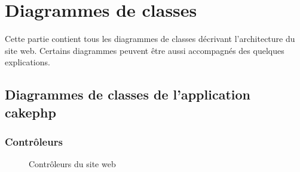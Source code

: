 \chapter{Diagrammes de classes}

Cette partie contient tous les diagrammes de classes décrivant l'architecture du site web. Certains diagrammes peuvent être aussi accompagnés des quelques explications.
 
\newpage

\section{Diagrammes de classes de l'application cakephp}

\subsection{Contrôleurs}

\begin{figure}[H]
	\begin{center}\end{center}
	\caption{Contrôleurs du site web}
\end{figure}

